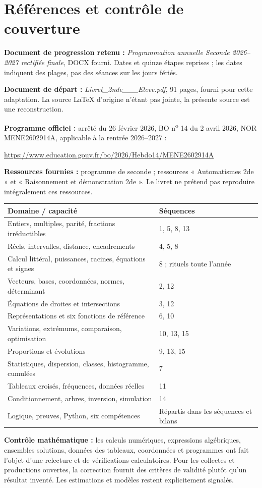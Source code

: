 \section*{Références et contrôle de couverture}
\textbf{Document de progression retenu :} \emph{Programmation annuelle Seconde 2026--2027 rectifiée finale}, DOCX fourni. Dates et quinze étapes reprises ; les dates indiquent des plages, pas des séances sur les jours fériés.
\par\textbf{Document de départ :} \emph{Livret\_2nde\_\_\_Eleve.pdf}, 91 pages, fourni pour cette adaptation. La source LaTeX d'origine n'étant pas jointe, la présente source est une reconstruction.
\par\textbf{Programme officiel :} arrêté du 26 février 2026, BO n\textsuperscript{o} 14 du 2 avril 2026, NOR MENE2602914A, applicable à la rentrée 2026--2027 :
\par\url{https://www.education.gouv.fr/bo/2026/Hebdo14/MENE2602914A}
\par\textbf{Ressources fournies :} programme de seconde ; ressources « Automatismes 2de » et « Raisonnement et démonstration 2de ». Le livret ne prétend pas reproduire intégralement ces ressources.
\begin{center}\small{}\begin{tabularx}{\linewidth}{p{8cm} X}
\textbf{Domaine / capacité}&\textbf{Séquences}\\\hline
Entiers, multiples, parité, fractions irréductibles&1, 5, 8, 13\\
Réels, intervalles, distance, encadrements&4, 5, 8\\
Calcul littéral, puissances, racines, équations et signes&8 ; rituels toute l'année\\
Vecteurs, bases, coordonnées, normes, déterminant&2, 12\\
Équations de droites et intersections&3, 12\\
Représentations et six fonctions de référence&6, 10\\
Variations, extrémums, comparaison, optimisation&10, 13, 15\\
Proportions et évolutions&9, 13, 15\\
Statistiques, dispersion, classes, histogramme, cumulées&7\\
Tableaux croisés, fréquences, données réelles&11\\
Conditionnement, arbres, inversion, simulation&14\\
Logique, preuves, Python, six compétences&Répartis dans les séquences et bilans
\end{tabularx}\end{center}
\textbf{Contrôle mathématique :} les calculs numériques, expressions algébriques, ensembles solutions, données des tableaux, coordonnées et programmes ont fait l'objet d'une relecture et de vérifications calculatoires. Pour les collectes et productions ouvertes, la correction fournit des critères de validité plutôt qu'un résultat inventé. Les estimations et modèles restent explicitement signalés.
